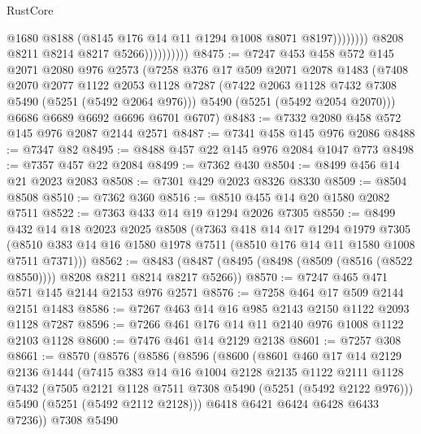 \begin{lexlean}{RustCore}
\begin{coremodule}
                                      @1680
                                      @8188
                                      (@8145 @176 @14 @11 @1294 @1008 @8071 @8197))))))))
                        @8208
                        @8211
                        @8214
                        @8217
                        @5266))))))))))
@8475 := @7247
    @453
    @458
    @572
    @145
    @2071
    @2080
    @976
    @2573
    (@7258
      @376
      @17
      @509
      @2071
      @2078
      @1483
      (@7408
        @2070
        @2077
        @1122
        @2053
        @1128
        @7287
        (@7422 @2063 @1128 @7432 @7308 @5490 (@5251 (@5492 @2064 @976)))
        @5490
        (@5251 (@5492 @2054 @2070)))
      @6686
      @6689
      @6692
      @6696
      @6701
      @6707)
@8483 := @7332 @2080 @458 @572 @145 @976 @2087 @2144 @2571
@8487 := @7341 @458 @145 @976 @2086
@8488 := @7347 @82
@8495 := @8488 @457 @22 @145 @976 @2084 @1047 @773
@8498 := @7357 @457 @22 @2084
@8499 := @7362 @430
@8504 := @8499 @456 @14 @21 @2023 @2083
@8508 := @7301 @429 @2023 @8326 @8330
@8509 := @8504 @8508
@8510 := @7362 @360
@8516 := @8510 @455 @14 @20 @1580 @2082 @7511
@8522 := @7363 @433 @14 @19 @1294 @2026 @7305
@8550 := @8499
    @432
    @14
    @18
    @2023
    @2025
    @8508
    (@7363
      @418
      @14
      @17
      @1294
      @1979
      @7305
      (@8510 @383 @14 @16 @1580 @1978 @7511 (@8510 @176 @14 @11 @1580 @1008 @7511 @7371)))
@8562 := @8483 (@8487 (@8495 (@8498 (@8509 (@8516 (@8522 @8550)))) @8208 @8211 @8214 @8217 @5266))
@8570 := @7247 @465 @471 @571 @145 @2144 @2153 @976 @2571
@8576 := @7258 @464 @17 @509 @2144 @2151 @1483
@8586 := @7267 @463 @14 @16 @985 @2143 @2150 @1122 @2093 @1128 @7287
@8596 := @7266 @461 @176 @14 @11 @2140 @976 @1008 @1122 @2103 @1128
@8600 := @7476 @461 @14 @2129 @2138
@8601 := @7257 @308
@8661 := @8570
    (@8576
      (@8586
        (@8596
          (@8600
            (@8601
              @460
              @17
              @14
              @2129
              @2136
              @1444
              (@7415
                @383
                @14
                @16
                @1004
                @2128
                @2135
                @1122
                @2111
                @1128
                @7432
                (@7505 @2121 @1128 @7511 @7308 @5490 (@5251 (@5492 @2122 @976)))
                @5490
                (@5251 (@5492 @2112 @2128)))
              @6418
              @6421
              @6424
              @6428
              @6433
              @7236))
          @7308
          @5490

\end{coremodule}
\end{lexlean}
